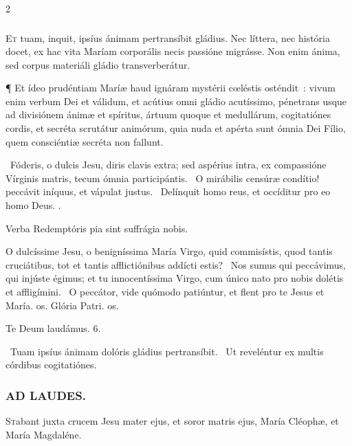\documentclass[9pt,twoside]{extarticle}
\begin{document}
\begin{multicols}{2}
\subsubsection*{\center {}}
\lettrine{E}t tuam, inquit, ipsíus ánimam pertransíbit gládius. Nec líttera, nec história docet, ex hac vita Maríam corporális necis passióne migrásse. Non enim ánima, sed corpus materiáli gládio transverberátur.

¶ Et ídeo prudéntiam Maríæ haud ignáram mystérii cœléstis osténdit~: vivum enim verbum Dei et válidum, et acútius omni gládio acutíssimo, pénetrans usque ad divisiónem ánimæ et spíritus, ártuum quoque et medullárum, cogitatiónes cordis, et secréta scrutátur animórum, quia nuda et apérta sunt ómnia Dei Fílio, quem consciéntiæ secréta non fallunt.

\begin{tightlist}{}
\item {}~Fóderis, o dulcis Jesu, diris clavis extra; sed aspérius intra, ex compassióne Vírginis matris, tecum ómnia participántis. \textred{*}~O mirábilis censúræ condítio! peccávit iníquus, et vápulat justus. ~Delínquit homo reus, et occíditur pro eo homo Deus. .
\item {}
\item {\small {} Verba Redemptóris pia sint suffrágia nobis.}
\item {} O dulcíssime Jesu, o benigníssima María Virgo, quid commisístis, quod tantis cruciátibus, tot et tantis afflictiónibus addícti estis? \textred{*}~Nos sumus qui peccávimus, qui injúste égimus; et tu innocentíssima Virgo, cum único nato pro nobis dolétis et affligímini. ~O peccátor, vide quómodo patiúntur, et flent pro te Jesus et María. os. Glória Patri. os.
\item Te Deum laudámus. 6.
\item {}~Tuam ipsíus ánimam dolóris gládius pertransíbit. ~Ut reveléntur ex multis córdibus cogitatiónes.
\end{tightlist}

\subsubsection*{\center \textsc{AD LAUDES.}}
\begin{center}\end{center}
\lettrine{S}tabant juxta crucem Jesu mater ejus, et soror matris ejus, María Cléophæ, et María Magdaléne.


\end{multicols}
\end{document}
